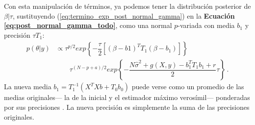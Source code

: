 Con esta manipulación de términos, ya podemos tener la distribución posterior de $\beta|\tau$, sustituyendo (\ref{eq:termino_exp_post_normal_gamma}) en la \textbf{Ecuación \ref{eq:post_normal_gamma_todo}}, como una normal $p$-variada con media $b_1$ y precisión $\tau T_1$: 
\begin{align*}
p(\theta|y) &\propto \tau^{p/2} exp\left\lbrace -\dfrac{\tau}{2}\left[(\beta-b1)^TT_1(\beta-b_1)\right]\right\rbrace \\
& \qquad \tau^{(N - p + a)/2} exp\left\lbrace -\dfrac{N\hat{\sigma}^2 + g(X,y) - b_1^TT_1b_1 + r}{2}\tau\right\rbrace \,.
\end{align*}
La nueva media $b_1=T_1^{-1}(X^TXb+T_0b_0)$ puede verse como un promedio de las medias originales--- la de la inicial y el estimador máximo verosímil--- ponderadas por sus precisiones \parencite[112]{Congdon06}. La nueva precisión es simplemente la suma de las precisiones originales.\\

